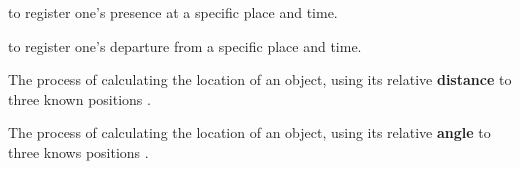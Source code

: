 {
  to register one's presence at a specific place and time.
}

{
  to register one's departure from a specific place and
  time.
}

{
  The process of calculating the location of an object,
  using its relative \textbf{distance} to three known
  positions \parencite{triTri}.
}

{
  The process of calculating the location of an object,
  using its relative \textbf{angle} to three knows
  positions \parencite{triTri}.
}